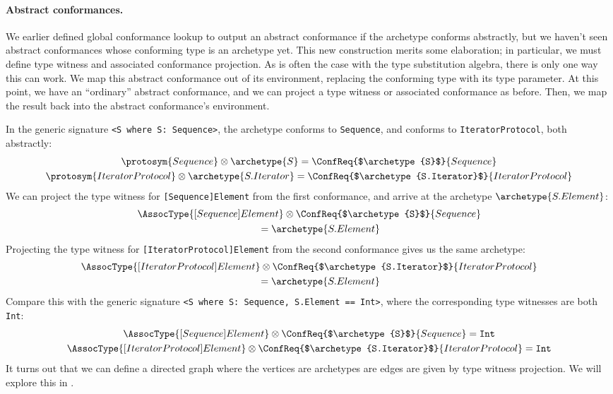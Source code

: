 \documentclass[../generics]{subfiles}
\begin{document}
\paragraph{Abstract conformances.}
We earlier defined global conformance lookup to output an abstract conformance if the archetype conforms abstractly, but we haven't seen abstract conformances whose conforming type is an archetype yet. This new construction merits some elaboration; in particular, we must define type witness and associated conformance projection. As is often the case with the type substitution algebra, there is only one way this can work. We map this abstract conformance out of its environment, replacing the conforming type with its type parameter. At this point, we have an ``ordinary'' abstract conformance, and we can project a type witness or associated conformance as before. Then, we map the result back into the abstract conformance's environment.

In the generic signature \verb|<S where S: Sequence>|, the archetype  conforms to \texttt{Sequence}, and  conforms to \texttt{IteratorProtocol}, both abstractly:
\begin{gather*}
\protosym{Sequence}\otimes \archetype{S} = \ConfReq{$\archetype{S}$}{Sequence}\\
\protosym{IteratorProtocol}\otimes \archetype{S.Iterator} = \ConfReq{$\archetype{S.Iterator}$}{IteratorProtocol}
\end{gather*}
We can project the type witness for \texttt{[Sequence]Element} from the first conformance, and arrive at the archetype $\archetype{S.Element}$:
\begin{gather*}
\AssocType{[Sequence]Element} \otimes \ConfReq{$\archetype{S}$}{Sequence}\\
\qquad {} = \archetype{S.Element}
\end{gather*}
Projecting the type witness for \texttt{[IteratorProtocol]Element} from the second conformance gives us the same archetype:
\begin{gather*}
\AssocType{[IteratorProtocol]Element}\otimes \ConfReq{$\archetype{S.Iterator}$}{IteratorProtocol}\\
\qquad {} = \archetype{S.Element} 
\end{gather*}
Compare this with the generic signature \verb|<S where S: Sequence, S.Element == Int>|, where the corresponding type witnesses are both \texttt{Int}:
\begin{gather*}
\AssocType{[Sequence]Element} \otimes \ConfReq{$\archetype{S}$}{Sequence} = \texttt{Int} \\
\AssocType{[IteratorProtocol]Element}\otimes \ConfReq{$\archetype{S.Iterator}$}{IteratorProtocol} = \texttt{Int}
\end{gather*}
It turns out that we can define a directed graph where the vertices are archetypes are edges are given by type witness projection. We will explore this in .
\end{document}
